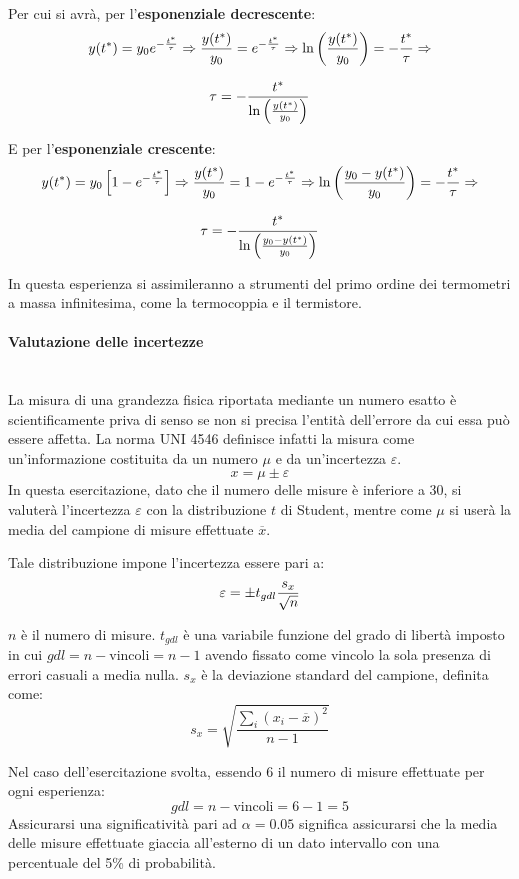\documentclass[a4paper, 12pt, twoside]{report}
\begin{document}
		Per cui si avrà, per l'\textbf{esponenziale decrescente}:
		\[ y(t^*) = y_0e^{-{t^*\over\tau}} \Rightarrow {y(t^*)\over y_0} = e^{-{t^*\over\tau}} \Rightarrow \ln\left(y(t^*)\over y_0\right) = -{t^*\over\tau} \Rightarrow\]
		 
		\[\tau = - \dfrac{t^*}{\ln\left(y(t^*)\over y_0\right)} \]
		
		E per l'\textbf{esponenziale crescente}:
		\[ y(t^*) = y_0\left[1-e^{-{t^*\over\tau}}\right] \Rightarrow {y(t^*)\over y_0} = 1- e^{-{t^*\over\tau}} \Rightarrow \ln\left(y_0-y(t^*)\over y_0\right) = -{t^*\over\tau} \Rightarrow\]
		
		\[\tau = - \dfrac{t^*}{\ln\left(y_0-y(t^*)\over y_0\right)} \]
		
		In questa esperienza si assimileranno a strumenti del primo ordine dei termometri a massa infinitesima, come la termocoppia e il termistore. 
		
		\paragraph{Valutazione delle incertezze} \mbox{} \\ 
		La misura di una grandezza fisica riportata mediante un numero esatto è scientificamente
		priva di senso se non si precisa l’entità dell’errore da cui essa può essere
		affetta. La norma UNI 4546 definisce infatti la misura come un’informazione
		costituita da un numero $\mu$ e da un’incertezza $\varepsilon$. 
		\[x = \mu\pm\varepsilon\]		
		In questa esercitazione, dato che il numero delle misure è inferiore a 30, si valuterà l'incertezza $\varepsilon$ con la distribuzione $t$ di Student, mentre come $\mu$ si userà la media del campione di misure effettuate $\overline{x}$.
		
		Tale distribuzione impone l'incertezza essere pari a:
		\[\varepsilon = \pm t_{gdl}{s_x\over\sqrt{n}}\]
		
		$n$ è il numero di misure. $t_{gdl}$ è una variabile funzione del grado di libertà imposto in cui $gdl = n -\text{vincoli} = n-1$ avendo fissato come vincolo la sola presenza di errori casuali a media nulla. $s_x$ è la deviazione standard del campione, definita come:
		\[s_x = \sqrt{\dfrac{\sum_i(x_i-\overline{x})^2}{n-1}}\]
		
		Nel caso dell'esercitazione svolta, essendo 6 il numero di misure effettuate per ogni esperienza: 
		\[gdl = n -\text{vincoli} = 6-1 = 5\]
		Assicurarsi una significatività pari ad $\alpha=0.05$ significa assicurarsi che la media delle misure effettuate giaccia all’esterno di un dato intervallo con una percentuale del 5\% di probabilità.
		
\end{document}
